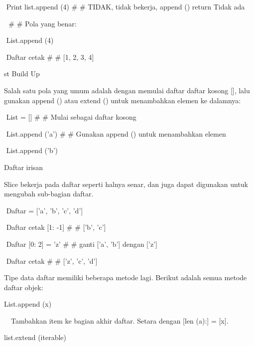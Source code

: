 \documentclass[a4paper,12pt]{report}
\begin{document}
\noindent 
 $  $ $  $Print list.append (4)  $  \#  $ $  \#  $ TIDAK, tidak bekerja, append () return Tidak ada \par
\noindent 
 $  $ $  $ $  \#  $ $  \#  $ Pola yang benar: \par
\noindent 
 $  $ $  $List.append (4) \par
\noindent 
 $  $ $  $Daftar cetak  $  \#  $ $  \#  $ [1, 2, 3, 4] \par
\noindent 
st Build Up \par
\vspace{12pt}
\noindent 
Salah satu pola yang umum adalah dengan memulai daftar daftar kosong [], lalu gunakan append () atau extend () untuk menambahkan elemen ke dalamnya: \par
\vspace{12pt}
\noindent 
 $  $ $  $List = []  $  \#  $ $  \#  $ Mulai sebagai daftar kosong \par
\noindent 
 $  $ $  $List.append ('a')  $  \#  $ $  \#  $ Gunakan append () untuk menambahkan elemen \par
\noindent 
 $  $ $  $List.append ('b') \par
\vspace{12pt}
\noindent 
Daftar irisan \par
\vspace{12pt}
\noindent 
Slice bekerja pada daftar seperti halnya senar, dan juga dapat digunakan untuk mengubah sub-bagian daftar. \par
\vspace{12pt}
\noindent 
 $  $ $  $Daftar = ['a', 'b', 'c', 'd'] \par
\noindent 
 $  $ $  $Daftar cetak [1: -1]  $  \#  $ $  \#  $ ['b', 'c'] \par
\noindent 
 $  $ $  $Daftar [0: 2] = 'z'  $  \#  $ $  \#  $ ganti ['a', 'b'] dengan ['z'] \par
\noindent 
 $  $ $  $Daftar cetak  $  \#  $ $  \#  $ ['z', 'c', 'd'] \par
\noindent 
Tipe data daftar memiliki beberapa metode lagi. Berikut adalah semua metode daftar objek: \par
\vspace{12pt}
\noindent 
List.append (x) \par
\vspace{12pt}
\noindent 
 $  $ $  $ $  $ $  $Tambahkan item ke bagian akhir daftar. Setara dengan [len (a):] = [x]. \par
\vspace{12pt}
\noindent 
list.extend (iterable) \par
\end{document}
